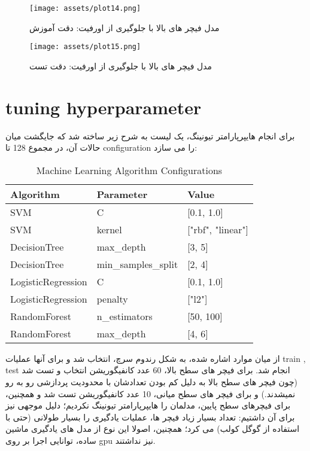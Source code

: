\documentclass[a4paper,12pt]{article}
\begin{document}
\begin{figure}[h]
	\centering
	\begin{minipage}[t]{0.40\textwidth}
		\centering
		\texttt{[image: assets/plot14.png]}
		\caption{\textcolor{CustomAccent}{مدل فیچر های بالا با جلوگیری از اورفیت: دقت آموزش }}
	\end{minipage}
	\hfill
	\begin{minipage}[t]{0.40\textwidth}
		\centering
		\texttt{[image: assets/plot15.png]}
		\caption{\textcolor{CustomAccent}{مدل فیچر های بالا با جلوگیری از اورفیت: دقت تست}}
	\end{minipage}
	\hfill
\end{figure}
\pagebreak

\section*{tuning hyperparameter}

برای انجام هایپرپارامتر تیونینگ، یک لیست به شرح زیر ساخته شد که جایگشت میان حالات آن، در مجموع 128 تا configuration را می سازد:

\begin{table}[h]
	\begin{latin}
	\centering
	\begin{tabular}{|l|l|l|}
		\hline
		\textbf{Algorithm} & \textbf{Parameter} & \textbf{Value} \\
		\hline
		SVM & C & [0.1, 1.0] \\
		\hline
		SVM & kernel & ["rbf", "linear"] \\
		\hline
		DecisionTree & max\_depth & [3, 5] \\
		\hline
		DecisionTree & min\_samples\_split & [2, 4] \\
		\hline
		LogisticRegression & C & [0.1, 1.0] \\
		\hline
		LogisticRegression & penalty & ["l2"] \\
		\hline
		RandomForest & n\_estimators & [50, 100] \\
		\hline
		RandomForest & max\_depth & [4, 6] \\
		\hline
	\end{tabular}
	\caption{Machine Learning Algorithm Configurations}
	\end{latin}
	\label{tab:ml_configs}
\end{table}

از میان موارد اشاره شده، به شکل رندوم سرچ، انتخاب شد و برای آنها عملیات train , test انجام شد. برای فیچر های سطح بالا، 60 عدد کانفیگوریشن انتخاب و تست شد (چون فیچر های سطح بالا به دلیل کم بودن تعدادشان با محدودیت پردازشی رو به رو نمیشدند.) و برای فیچر های سطح میانی، 10 عدد کانفیگوریشن تست شد و همچنین، برای فیچرهای سطح پایین، مدلمان را هایپرپارامتر تیونینگ نکردیم؛ دلیل موجهی نیز برای آن داشتیم: تعداد بسیار زیاد فیچر ها، عملیات یادگیری را بسیار طولانی (حتی با استفاده از گوگل کولب) می کرد؛ همچنین، اصولا این نوع از مدل های یادگیری ماشین ساده، توانایی اجرا بر روی gpu نیز نداشتند.
\end{document}
